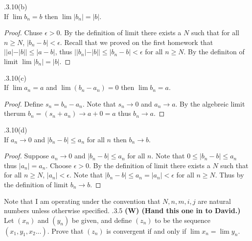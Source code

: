 \documentclass[12pt]{article}
\makeatletter
\theoremstyle{homework}
\newenvironment{exercise}[1]
{\def\@currentlabel{#1}\exercisecore}
{\endexercisecore}
\newcommand\W{{\color{red}\textbf{(W) (Hand this one in to David.)}}}
\makeatother
\begin{document}
\begin{exercise}

2.3.10(b)\\
If $\lim b_n=b$ then $\lim |b_n|=|b|$.
\end{exercise}
\begin{proof}
Chuse $\epsilon>0$.  By the definition of limit there exists a $N$ such that for all $n\geq N$, $|b_n-b|<\epsilon$.  Recall that we proved on the first homework that  $||a| - |b|| \leq |a - b|$, thus $||b_n|-|b||\leq |b_n-b|<\epsilon$ for all $n\geq N$.  By the definiton of limit $\lim |b_n|=|b|$.
\end{proof}

\begin{exercise}

2.3.10(c)\\
If $\lim a_n=a$ and $\lim(b_n-a_n)=0$ then $\lim b_n=a$.
\end{exercise}
\begin{proof}
Define $s_n=b_n-a_n$.  Note that $s_n\rightarrow 0$ and $a_n\rightarrow a$.  By the algebreic limit therum $b_n=(s_n+a_n)\rightarrow a+0=a$ thus $b_n\rightarrow a$.
\end{proof}

\begin{exercise}

2.3.10(d)\\
If $a_n\rightarrow 0$ and $|b_n-b|\leq a_n$ for all $n$ then $b_n\rightarrow b$.
\end{exercise}
\begin{proof}
Suppose $a_n\rightarrow 0$ and $|b_n-b|\leq a_n$ for all $n$.  Note that $0\leq |b_n-b|\leq a_n$ thus $|a_n|=a_n$.  Choose $\epsilon>0$.  By the definition of limit there exists a $N$ such that for all $n\geq N$, $|a_n|<\epsilon$.  Note that $|b_n-b|\leq a_n=|a_n|<\epsilon$ for all $n\geq N$.  Thus by the definition of limit $b_n\rightarrow b$.
\end{proof}
















\newpage

Note that I am operating under the convention that $N,n,m,i,j$ are natural numbers unless otherwise specified.
\begin{exercise}

2.3.5 \W\\
Let $(x_n)$ and $(y_n)$ be given, and define $(z_n)$ to be the sequence $(x_1,y_1,x_2...)$.  Prove that $(z_n)$ is convergent if and only if $\lim x_n=\lim y_n$.
\end{exercise}
\end{document}
